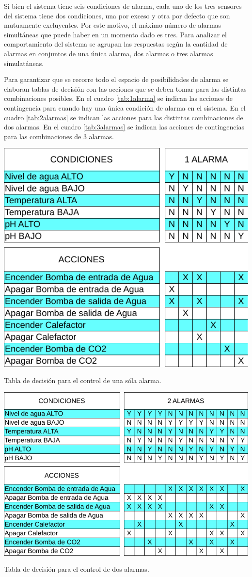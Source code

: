 Si bien el sistema tiene seis condiciones de alarma, cada uno de los tres sensores del sistema tiene dos condiciones, una por exceso y otra por defecto que son mutuamente excluyentes.  Por este motivo, el máximo número de alarmas simultáneas que puede haber en un momento dado es tres. Para analizar el comportamiento del sistema se agrupan las respuestas según la cantidad de alarmas en conjuntos de una única alarma, dos alarmas o tres alarmas simulatáneas.

Para garantizar que se recorre todo el espacio de posibilidades de alarma se elaboran tablas de decisión con las acciones que se deben tomar para las distintas combinaciones posibles.  En el cuadro \ref{tab:1alarma} se indican las acciones de contingencia para cuando hay una única condición de alarma en el sistema.  En el cuadro \ref{tab:2alarmas} se indican las acciones para las distintas combinaciones de dos alarmas. En el cuadro \ref{tab:3alarmas} se indican las acciones de contingencias para las combinaciones de 3 alarmas.

\begin{table}[p]
	\centering
    \includegraphics[width=.55\textwidth]{./Figures/tabla1alarma.pdf}
	\caption{Tabla de decisión para el control de una sóla alarma.}
	\label{tab:1alarma}
\end{table}

\begin{table}[p]
	\centering
    \includegraphics[width=.75\textwidth]{./Figures/tabla2alarmas.pdf}
	\caption{Tabla de decisión para el control de dos alarmas.}
	\label{tab:2alarmas}
\end{table}

